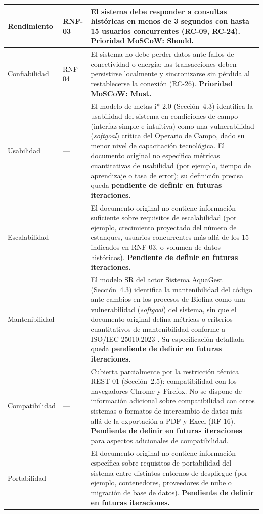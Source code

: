 \documentclass[12pt,a4paper]{article}
\begin{document}
\begin{longtable}{|p{2.6cm}|p{1.4cm}|p{9.8cm}|}
Rendimiento & RNF-03 &
El sistema debe responder a consultas históricas en menos de 3 segundos con
hasta 15 usuarios concurrentes (RC-09, RC-24). \textbf{Prioridad MoSCoW:
Should.} \\
\hline

Confiabilidad & RNF-04 &
El sistema no debe perder datos ante fallos de conectividad o energía;
las transacciones deben persistirse localmente y sincronizarse sin pérdida al
restablecerse la conexión (RC-26). \textbf{Prioridad MoSCoW: Must.} \\
\hline

Usabilidad & --- &
El modelo de metas i* 2.0 (Sección~4.3) identifica la usabilidad del sistema en
condiciones de campo (interfaz simple e intuitiva) como una vulnerabilidad
(\textit{softgoal}) crítica del Operario de Campo, dado su menor nivel de
capacitación tecnológica. El documento original no especifica métricas
cuantitativas de usabilidad (por ejemplo, tiempo de aprendizaje o tasa de
error); su definición precisa queda \textbf{pendiente de definir en futuras
iteraciones}. \\
\hline

Escalabilidad & --- &
El documento original no contiene información suficiente sobre requisitos de
escalabilidad (por ejemplo, crecimiento proyectado del número de estanques,
usuarios concurrentes más allá de los 15 indicados en RNF-03, o volumen de
datos históricos). \textbf{Pendiente de definir en futuras iteraciones.} \\
\hline

Mantenibilidad & --- &
El modelo SR del actor Sistema AquaGest (Sección~4.3) identifica la
mantenibilidad del código ante cambios en los procesos de Biofina como una
vulnerabilidad (\textit{softgoal}) del sistema, sin que el documento original
defina métricas o criterios cuantitativos de mantenibilidad conforme a
ISO/IEC 25010:2023 \cite{ISO25010:2023}. Su especificación detallada queda
\textbf{pendiente de definir en futuras iteraciones}. \\
\hline

Compatibilidad & --- &
Cubierta parcialmente por la restricción técnica REST-01 (Sección~2.5):
compatibilidad con los navegadores Chrome y Firefox. No se dispone de
información adicional sobre compatibilidad con otros sistemas o formatos de
intercambio de datos más allá de la exportación a PDF y Excel (RF-16).
\textbf{Pendiente de definir en futuras iteraciones} para aspectos adicionales
de compatibilidad. \\
\hline

Portabilidad & --- &
El documento original no contiene información específica sobre requisitos de
portabilidad del sistema entre distintos entornos de despliegue (por ejemplo,
contenedores, proveedores de nube o migración de base de datos).
\textbf{Pendiente de definir en futuras iteraciones.} \\
\hline
\end{longtable}
\end{document}
